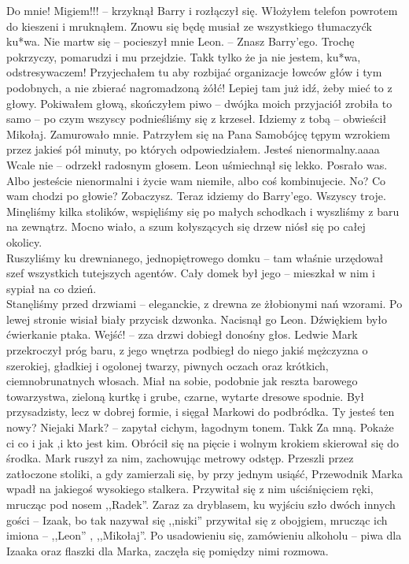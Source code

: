 \documentclass[../MAIN.tex]{subfiles}
\begin{document}
\sx Do mnie! Migiem!!! -- krzyknął Barry i rozłączył się. \qd
Włożyłem telefon powrotem do kieszeni i mruknąłem.
\sx Znowu się będę musiał ze wszystkiego tłumaczyć\3k ku*wa.
\xx Nie martw się -- pocieszył mnie Leon. -- Znasz Barry’ego. Trochę pokrzyczy, pomarudzi i mu przejdzie.
\xx Tak\3k tylko że ja nie jestem, ku*wa, odstresywaczem! Przyjechałem tu aby rozbijać organizacje łowców głów i tym podobnych, a nie zbierać nagromadzoną żółć!
\xx Lepiej tam już idź, żeby mieć to z głowy.
\qd
Pokiwałem głową, skończyłem piwo -- dwójka moich przyjaciół zrobiła to samo -- po czym wszyscy podnieśliśmy się z krzeseł.
\sx Idziemy z tobą -- obwieścił Mikołaj. \qd
Zamurowało mnie. Patrzyłem się na Pana Samobójcę tępym wzrokiem przez jakieś pół minuty, po których odpowiedziałem.
%
\sx Jesteś nienormalny.aaaa
\xx Wcale nie -- odrzekł radosnym głosem. Leon uśmiechnął się lekko.
\xx Posrało was. Albo jesteście nienormalni i życie wam niemiłe, albo coś kombinujecie. No? Co wam chodzi po głowie?
\xx Zobaczysz. Teraz idziemy do Barry’ego. Wszyscy troje.
\qd
Minęliśmy kilka stolików, wspięliśmy się po małych schodkach i wyszliśmy z baru na zewnątrz.  Mocno wiało, a szum kołyszących się drzew niósł się po całej okolicy. \\
Ruszyliśmy ku drewnianego, jednopiętrowego domku -- tam właśnie urzędował szef wszystkich tutejszych agentów. Cały domek był jego -- mieszkał w nim i sypiał na co dzień. \\
Stanęliśmy przed drzwiami -- eleganckie, z drewna ze żłobionymi nań wzorami. Po lewej stronie wisiał biały przycisk dzwonka.
Nacisnął go Leon. Dźwiękiem było ćwierkanie ptaka.
\sx Wejść! -- zza drzwi dobiegł donośny głos. \qd
%
%
Ledwie Mark przekroczył próg baru, z jego wnętrza podbiegł do niego jakiś mężczyzna o szerokiej, gładkiej i ogolonej twarzy, piwnych oczach oraz krótkich, ciemnobrunatnych włosach. Miał na sobie, podobnie jak reszta barowego towarzystwa, zieloną kurtkę i grube, czarne, wytarte dresowe spodnie. Był przysadzisty, lecz w dobrej formie, i sięgał Markowi do podbródka.
%
\sx Ty jesteś ten nowy? Niejaki Mark? -- zapytał cichym, łagodnym tonem.
\xx Tak\3k
\xx Za mną. Pokaże ci co i jak ,i kto jest kim.
\qd
Obrócił się na pięcie i wolnym krokiem skierował się do środka. Mark ruszył za nim, zachowując metrowy odstęp. Przeszli przez zatłoczone stoliki, a gdy zamierzali się, by przy jednym usiąść, Przewodnik Marka wpadł na jakiegoś wysokiego stalkera. Przywitał się z nim uściśnięciem ręki, mrucząc pod nosem ,,Radek''. Zaraz za dryblasem, ku wyjściu szło dwóch innych gości -- Izaak, bo tak nazywał się ,,niski'' przywitał się z obojgiem, mrucząc ich imiona -- ,,Leon'' , ,,Mikołaj''. Po usadowieniu się, zamówieniu alkoholu -- piwa dla Izaaka oraz flaszki dla Marka, zaczęła się pomiędzy nimi rozmowa.
\end{document}
